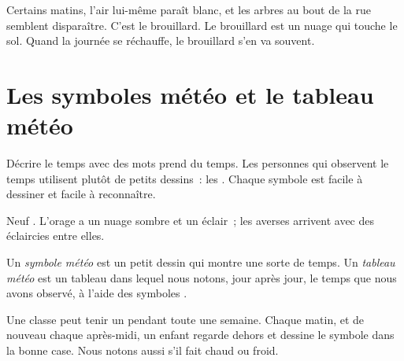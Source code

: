 \begin{example}[Le brouillard]\label{ex:g1:watching-the-weather:fog}
Certains matins, l'air lui-même paraît blanc, et les arbres au bout de la
rue semblent disparaître. C'est le brouillard. Le brouillard est un nuage
qui touche le sol. Quand la journée se réchauffe, le brouillard s'en va souvent.
\end{example}

\section{Les symboles météo et le tableau météo}

Décrire le temps avec des mots prend du temps. Les personnes qui observent
le temps utilisent plutôt de petits dessins~: les . Chaque
symbole est facile à dessiner et facile à reconnaître.

\begin{omfigure}

{\small Neuf . L'orage a un nuage sombre et un éclair~; les
averses arrivent avec des éclaircies entre elles.}
\end{omfigure}

\begin{definition}\label{def:g1:watching-the-weather:weather-chart}
Un \emph{symbole météo} est un petit dessin qui montre
une sorte de temps. Un \emph{tableau météo} est un
tableau dans lequel nous notons, jour après jour, le temps que nous avons
observé, à l'aide des symboles .
\end{definition}

Une classe peut tenir un  pendant toute une semaine. Chaque
matin, et de nouveau chaque après-midi, un enfant regarde dehors et dessine
le symbole dans la bonne case. Nous notons aussi s'il fait chaud ou froid.

